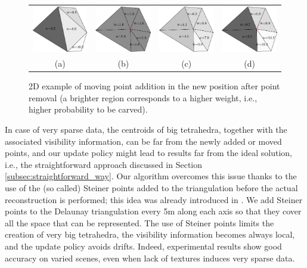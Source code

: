 \begin{figure}[t]
\begin{center}
\begin{tabular}{cccc}
\centering
\includegraphics[width=0.21\columnwidth]{./img//mooving_orig}&
\includegraphics[width=0.21\columnwidth]{./img//mooving_avg}&
\includegraphics[width=0.21\columnwidth]{./img//mooving_weighted_avg}&
\includegraphics[width=0.21\columnwidth]{./img//mooving_min}\\
(a) & (b) & (c) & (d)\\
\end{tabular}
\end{center}
\caption{2D example of moving point addition in the new position after point removal (a brighter region corresponds to a higher weight, i.e., higher probability to be carved).}
\label{fig:reconstrEx_2}
\end{figure}

In case of very sparse data, the centroids of big tetrahedra, together with the associated visibility information, can be far from the newly added or moved points, and our update policy might lead to results far from the ideal solution, i.e., the straightforward approach discussed in Section \ref{subsec:straightforward_way}. Our algorithm overcomes this issue thanks to the use of the (so called) Steiner points added to the triangulation before the actual reconstruction is performed; this idea was already introduced in \cite{litvinov_lhuillier_13}.
We add Steiner points to the Delaunay triangulation every 5m along each axis so that they cover all the space that can be represented. The use of Steiner points limits the creation of very big tetrahedra, the visibility information becomes always local, and the update policy avoids drifts. Indeed, experimental results show good accuracy on varied scenes, even when lack of textures induces very sparse data.


